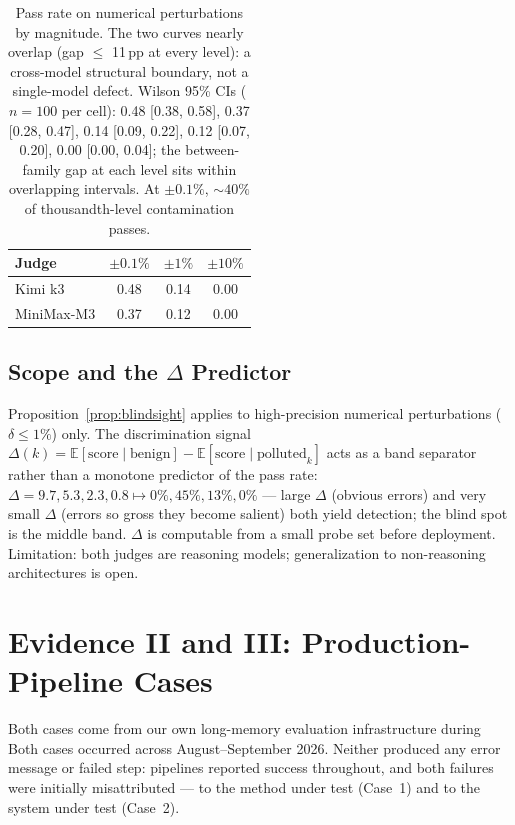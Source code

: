 \documentclass[11pt]{article}
\begin{document}
\begin{table}[h]
\centering\small
\begin{tabular}{lccc}
\toprule
Judge & $\pm 0.1\%$ & $\pm 1\%$ & $\pm 10\%$ \\
\midrule
Kimi k3    & 0.48 & 0.14 & 0.00 \\
MiniMax-M3 & 0.37 & 0.12 & 0.00 \\
\bottomrule
\end{tabular}
\caption{Pass rate on numerical perturbations by magnitude. The two curves nearly
overlap (gap $\leq$ 11\,pp at every level): a cross-model structural boundary,
not a single-model defect. Wilson 95\% CIs ($n{=}100$ per cell): 0.48
[0.38, 0.58], 0.37 [0.28, 0.47], 0.14 [0.09, 0.22], 0.12 [0.07, 0.20],
0.00 [0.00, 0.04]; the between-family gap at each level sits within
overlapping intervals.
At $\pm 0.1\%$, ${\sim}40\%$ of thousandth-level
contamination passes.}
\label{tab:round3}
\end{table}

\subsection{Scope and the $\Delta$ Predictor}
\label{sec:scope}
Proposition~\ref{prop:blindsight} applies to high-precision numerical perturbations
($\delta \leq 1\%$) only. The discrimination signal
$\Delta(k) = \mathbb{E}[\text{score}\mid\text{benign}] -
\mathbb{E}[\text{score}\mid\text{polluted}_k]$
acts as a band separator rather than a monotone predictor of the pass rate:
$\Delta = 9.7, 5.3, 2.3, 0.8 \mapsto 0\%,
45\%, 13\%, 0\%$ --- large $\Delta$ (obvious errors) and very small $\Delta$
(errors so gross they become salient) both yield detection; the blind spot is the
middle band. $\Delta$ is computable from a small probe set before deployment.
Limitation: both judges are reasoning models; generalization to non-reasoning
architectures is open.

\section{Evidence II and III: Production-Pipeline Cases}
\label{sec:evidence2}

Both cases come from our own long-memory evaluation infrastructure during
Both cases occurred across August--September 2026. Neither produced any error message or failed step: pipelines
reported success throughout, and both failures were initially misattributed ---
to the method under test (Case~1) and to the system under test (Case~2).
\end{document}
